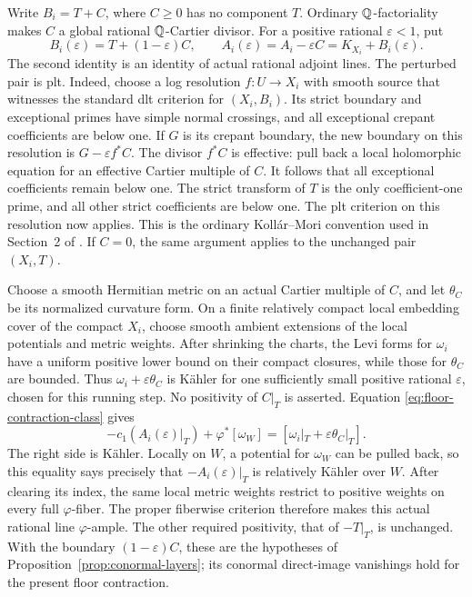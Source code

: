 Write \(B_i=T+C\), where \(C\geq0\) has no component \(T\).
Ordinary \(\mathbb Q\)-factoriality makes \(C\) a global rational
\(\mathbb Q\)-Cartier divisor.  For a positive rational
\(\varepsilon<1\), put
\[
 B_i(\varepsilon)=T+(1-\varepsilon)C,\qquad
 A_i(\varepsilon)=A_i-\varepsilon C
                 =K_{X_i}+B_i(\varepsilon).
\]
The second identity is an identity of actual rational adjoint lines.
The perturbed pair is plt.  Indeed, choose a log resolution
\(f:U\to X_i\) with smooth source that witnesses the standard dlt
criterion for \((X_i,B_i)\).
Its strict boundary and exceptional primes have simple normal crossings,
and all exceptional crepant coefficients are below one.  If \(G\) is its
crepant boundary, the new boundary on this resolution is
\(G-\varepsilon f^*C\).  The divisor \(f^*C\) is effective: pull back
a local holomorphic equation for an effective Cartier multiple of \(C\).
It follows that all exceptional coefficients remain below one.  The
strict transform of \(T\) is the only coefficient-one prime, and all
other strict coefficients are below one.  The plt criterion on this
resolution now applies.  This is the ordinary Koll\'ar--Mori convention
used in Section~2 of \cite{DasHacon2024OnMMP}.  If \(C=0\), the same
argument applies to the unchanged pair \((X_i,T)\).

Choose a smooth Hermitian metric on an actual Cartier multiple of \(C\),
and let \(\theta_C\) be its normalized curvature form.  On a finite
relatively compact local embedding cover of the compact \(X_i\), choose
smooth ambient extensions of the local potentials and metric weights.
After shrinking the charts, the Levi forms for \(\omega_i\) have a
uniform positive lower bound on their compact closures, while those for
\(\theta_C\) are bounded.  Thus \(\omega_i+\varepsilon\theta_C\) is K\"ahler for
one sufficiently small positive rational \(\varepsilon\), chosen for
this running step.  No positivity of \(C|_T\) is asserted.  Equation
\eqref{eq:floor-contraction-class} gives
\begin{equation}\label{eq:plt-contraction-class}
 -c_1(A_i(\varepsilon)|_T)+\varphi^*[\omega_W]
       =[\omega_i|_T+\varepsilon\theta_C|_T].
\end{equation}
The right side is K\"ahler.  Locally on \(W\), a potential for
\(\omega_W\) can be pulled back, so this equality says precisely that
\(-A_i(\varepsilon)|_T\) is relatively K\"ahler over \(W\).
After clearing its index, the same local metric weights restrict to
positive weights on every full \(\varphi\)-fiber.  The proper fiberwise
criterion \cite[Corollary~1.12, Definition~3.1 and Remark~3.2]{Fujino2026Fujiki}
therefore makes this actual rational line \(\varphi\)-ample.  The other
required positivity, that of \(-T|_T\), is unchanged.  With the boundary
\((1-\varepsilon)C\), these are the hypotheses of
Proposition~\ref{prop:conormal-layers}; its conormal direct-image
vanishings hold for the present floor contraction.

